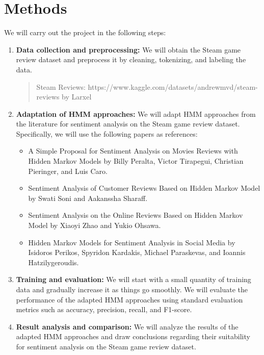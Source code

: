 \documentclass{article}
\begin{document}
\section{Methods}
We will carry out the project in the following steps:
\begin{enumerate}
\item \textbf{Data collection and preprocessing:} We will obtain the Steam game review dataset and preprocess it by cleaning, tokenizing, and labeling the data.
\begin{quote}
Steam Reviews: https://www.kaggle.com/datasets/andrewmvd/steam-reviews by Larxel
\end{quote}
\item \textbf{Adaptation of HMM approaches:} We will adapt HMM approaches from the literature for sentiment analysis on the Steam game review dataset. Specifically, we will use the following papers as references:
\begin{itemize}
\item A Simple Proposal for Sentiment Analysis on Movies Reviews with Hidden Markov Models by Billy Peralta, Victor Tirapegui, Christian Pieringer, and Luis Caro.
\item Sentiment Analysis of Customer Reviews Based on Hidden Markov Model by Swati Soni and Aakanssha Sharaff.
\item Sentiment Analysis on the Online Reviews Based on Hidden Markov Model by Xiaoyi Zhao and Yukio Ohsawa.
\item Hidden Markov Models for Sentiment Analysis in Social Media by Isidoros Perikos, Spyridon Kardakis, Michael Paraskevas, and Ioannis Hatzilygeroudis.
\end{itemize}
\item \textbf{Training and evaluation:} We will start with a small quantity of training data and gradually increase it as things go smoothly. We will evaluate the performance of the adapted HMM approaches using standard evaluation metrics such as accuracy, precision, recall, and F1-score.
\item \textbf{Result analysis and comparison:} We will analyze the results of the adapted HMM approaches and draw conclusions regarding their suitability for sentiment analysis on the Steam game review dataset.
\end{enumerate}
\end{document}
